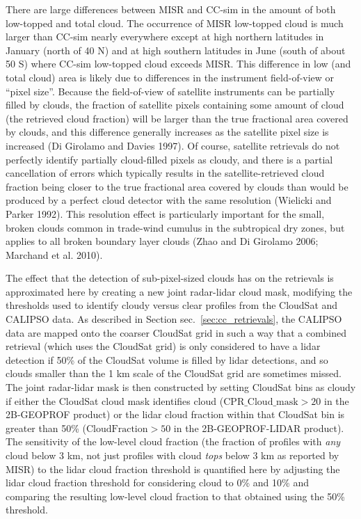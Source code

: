 There are large differences between MISR and CC-sim in the amount of
both low-topped and total cloud. The occurrence of MISR low-topped cloud
is much larger than CC-sim nearly everywhere except at high northern
latitudes in January (north of 40 N) and at high southern latitudes in
June (south of about 50 S) where CC-sim low-topped cloud exceeds MISR.
This difference in low (and total cloud) area is likely due to
differences in the instrument field-of-view or ``pixel size''. Because
the field-of-view of satellite instruments can be partially filled by
clouds, the fraction of satellite pixels containing some amount of cloud
(the retrieved cloud fraction) will be larger than the true fractional
area covered by clouds, and this difference generally increases as the
satellite pixel size is increased (Di Girolamo and Davies 1997). Of
course, satellite retrievals do not perfectly identify partially
cloud-filled pixels as cloudy, and there is a partial cancellation of
errors which typically results in the satellite-retrieved cloud fraction
being closer to the true fractional area covered by clouds than would be
produced by a perfect cloud detector with the same resolution (Wielicki
and Parker 1992). This resolution effect is particularly important for
the small, broken clouds common in trade-wind cumulus in the subtropical
dry zones, but applies to all broken boundary layer clouds (Zhao and Di
Girolamo 2006; Marchand et al. 2010).

The effect that the detection of sub-pixel-sized clouds has on the
retrievals is approximated here by creating a new joint radar-lidar
cloud mask, modifying the thresholds used to identify cloudy versus
clear profiles from the CloudSat and CALIPSO data. As described in
Section sec.~\ref{sec:cc_retrievals}, the CALIPSO data are mapped onto
the coarser CloudSat grid in such a way that a combined retrieval (which
uses the CloudSat grid) is only considered to have a lidar detection if
50\% of the CloudSat volume is filled by lidar detections, and so clouds
smaller than the 1 km scale of the CloudSat grid are sometimes missed.
The joint radar-lidar mask is then constructed by setting CloudSat bins
as cloudy if either the CloudSat cloud mask identifies cloud
(\(\textrm{CPR\_Cloud\_mask} > 20\) in the 2B-GEOPROF product) or the
lidar cloud fraction within that CloudSat bin is greater than 50\%
(\(\textrm{CloudFraction} > 50\) in the 2B-GEOPROF-LIDAR product). The
sensitivity of the low-level cloud fraction (the fraction of profiles
with \emph{any} cloud below 3 km, not just profiles with cloud
\emph{tops} below 3 km as reported by MISR) to the lidar cloud fraction
threshold is quantified here by adjusting the lidar cloud fraction
threshold for considering cloud to 0\% and 10\% and comparing the
resulting low-level cloud fraction to that obtained using the 50\%
threshold.

